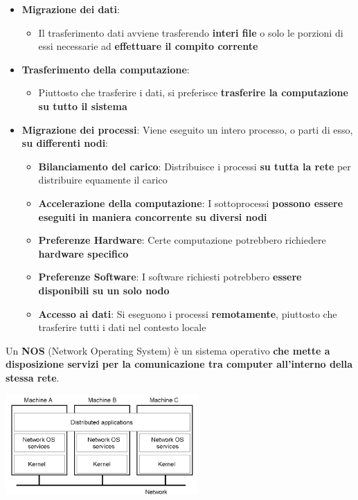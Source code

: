 \documentclass[12pt]{article}
\begin{document}
\begin{itemize}
    \item \textbf{Migrazione dei dati}:
          \begin{itemize}
              \item Il trasferimento dati avviene trasferendo \textbf{interi file} o solo le porzioni di essi necessarie ad \textbf{effettuare il compito corrente}
          \end{itemize}
    \item \textbf{Trasferimento della computazione}:
          \begin{itemize}
              \item Piuttosto che trasferire i dati, si preferisce \textbf{trasferire la computazione su tutto il sistema}
          \end{itemize}
    \item \textbf{Migrazione dei processi}: Viene eseguito un intero processo, o parti di esso, \textbf{su differenti nodi}:
          \begin{itemize}
              \item \textbf{Bilanciamento del carico}: Distribuisce i processi \textbf{su tutta la rete} per distribuire equamente il carico
              \item \textbf{Accelerazione della computazione}: I sottoprocessi \textbf{possono essere eseguiti in maniera concorrente su diversi nodi}
              \item \textbf{Preferenze Hardware}: Certe computazione potrebbero richiedere \textbf{hardware specifico}
              \item \textbf{Preferenze Software}: I software richiesti potrebbero \textbf{essere disponibili su un solo nodo}
              \item \textbf{Accesso ai dati}: Si eseguono i processi \textbf{remotamente}, piuttosto che trasferire tutti i dati nel contesto locale
          \end{itemize}
\end{itemize}
Un \textbf{NOS} (Network Operating System) è un sistema operativo \textbf{che mette a disposizione servizi per la comunicazione tra computer all'interno della stessa rete}.
\begin{center}
    \includegraphics[width = 0.55\textwidth]{Images/12.PNG}
\end{center}
\end{document}
